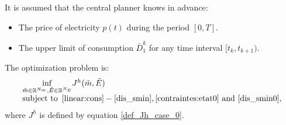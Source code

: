 \documentclass[conference]{IEEEtran}
\begin{document}
It is assumed that the central planner knows in advance:
\begin{itemize}
\item The price of electricity $p(t)$ during the period $[0,T]$.
\item The upper limit of consumption $\bar{D}_1^k$ for any time interval $[t_k,t_{k+1})$.
\end{itemize}
The optimization problem is:
\begin{equation}
\label{disc:pb:0}
\begin{array}{l}
 \underset{\tilde{m}\in\mathbb{R}^{N_m},\tilde{E}\in\mathbb{R}^{N_E}}{\inf}J^h(\tilde{m},\tilde{E}) \\
 \mbox{subject to }\, \eqref{linear:cons}-\eqref{dis_smin},\eqref{contraintes:etat0}\mbox{ and }\eqref{dis_smin0},
\end{array}
\end{equation}
where $J^h$ is defined by equation \eqref{def_Jh_case_0}. 
\end{document}

